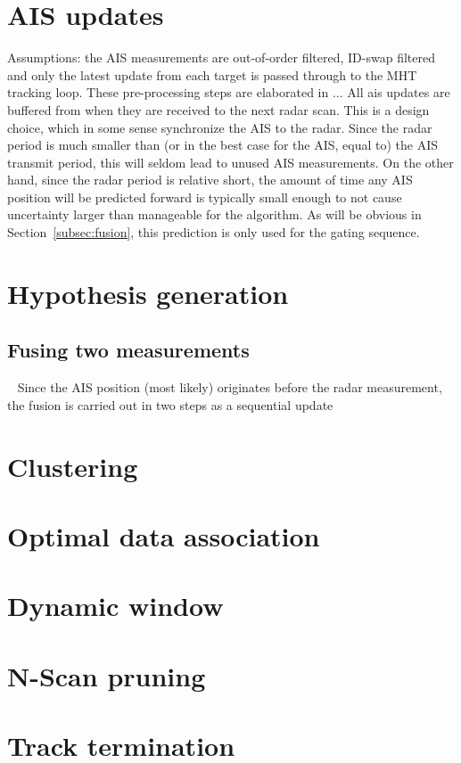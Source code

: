 \section{AIS updates}
Assumptions: the AIS measurements are out-of-order filtered, ID-swap filtered and only the latest update from each target is passed through to the MHT tracking loop. These pre-processing steps are elaborated in ...
All \gls{ais} updates are buffered from when they are received to the next radar scan. This is a design choice, which in some sense synchronize the AIS to the radar. Since the radar period is much smaller than (or in the best case for the AIS, equal to) the AIS transmit period, this will seldom lead to unused AIS measurements. On the other hand, since the radar period is relative short, the amount of time any AIS position will be predicted forward is typically small enough to not cause uncertainty larger than manageable for the algorithm. As will be obvious in Section~\ref{subsec:fusion}, this prediction is only used for the gating sequence.

\section{Hypothesis generation}


\subsection{Fusing two measurements}~\label{subsec:fusion}
Since the AIS position (most likely) originates before the radar measurement, the fusion is carried out in two steps as a sequential update~\cite{Bar-Shalom1995}


\section{Clustering}

\section{Optimal data association}


\section{Dynamic window}

\section{N-Scan pruning}

\section{Track termination}